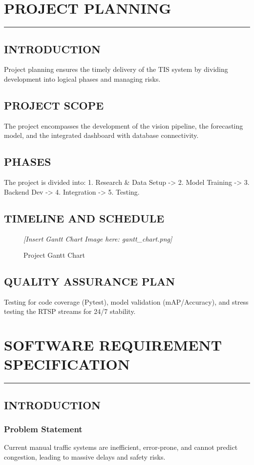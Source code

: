 \documentclass[12pt,times,a4paper]{report}
\newcommand\HRule{\rule{\textwidth}{1pt}}
\begin{document}
\chapter{PROJECT PLANNING}
\HRule
\section{INTRODUCTION}
Project planning ensures the timely delivery of the TIS system by dividing development into logical phases and managing risks.

\section{PROJECT SCOPE}
The project encompasses the development of the vision pipeline, the forecasting model, and the integrated dashboard with database connectivity.

\section{PHASES}
The project is divided into:
1. Research & Data Setup -> 2. Model Training -> 3. Backend Dev -> 4. Integration -> 5. Testing.

\section{TIMELINE AND SCHEDULE}
\begin{figure}[h!]
    \centering
    \textit{[Insert Gantt Chart Image here: gantt_chart.png]}
    \caption{Project Gantt Chart}
\end{figure}

\section{QUALITY ASSURANCE PLAN}
Testing for code coverage (Pytest), model validation (mAP/Accuracy), and stress testing the RTSP streams for 24/7 stability.

\chapter{SOFTWARE REQUIREMENT SPECIFICATION}
\HRule
\section{INTRODUCTION}
\subsection{Problem Statement}
Current manual traffic systems are inefficient, error-prone, and cannot predict congestion, leading to massive delays and safety risks.
\end{document}
